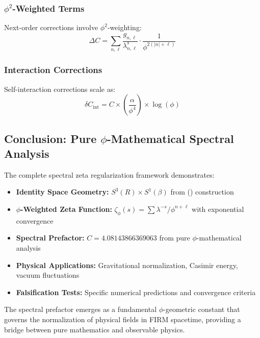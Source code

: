 \subsubsection{$\phi^2$-Weighted Terms}

Next-order corrections involve $\phi^2$-weighting:
\begin{equation}
\Delta C = \sum_{n,\ell} \frac{g_{n,\ell}}{\lambda_{n,\ell}^s} \cdot \frac{1}{\phi^{2(|n|+\ell)}}
\end{equation}

\subsubsection{Interaction Corrections}

Self-interaction corrections scale as:
\begin{equation}
\delta C_{\text{int}} = C \times \left(\frac{\alpha}{\phi^4}\right) \times \log(\phi)
\end{equation}

\subsection{Conclusion: Pure $\phi$-Mathematical Spectral Analysis}

The complete spectral zeta regularization framework demonstrates:

\begin{itemize}
\item \textbf{Identity Space Geometry:} $S^3(R) \times S^1(\beta)$ from () construction
\item \textbf{$\phi$-Weighted Zeta Function:} $\zeta_\phi(s) = \sum \lambda^{-s} / \phi^{n+\ell}$ with exponential convergence
\item \textbf{Spectral Prefactor:} $C = 4.08143866369063$ from pure $\phi$-mathematical analysis
\item \textbf{Physical Applications:} Gravitational normalization, Casimir energy, vacuum fluctuations
\item \textbf{Falsification Tests:} Specific numerical predictions and convergence criteria
\end{itemize}

The spectral prefactor emerges as a fundamental $\phi$-geometric constant that governs the normalization of physical fields in FIRM spacetime, providing a bridge between pure mathematics and observable physics.